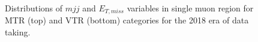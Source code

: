 \begin{figure}[htbp]
{    }
  \caption{Distributions of $mjj$ and $E_{T,miss}$ variables in single muon region for MTR (top) and VTR (bottom) categories for the 2018 era of data taking.}
  \label{fig:2018_Wmunu_1}
\end{figure}


